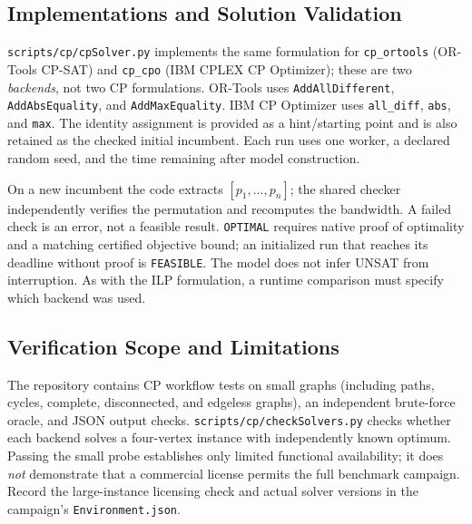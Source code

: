 \subsection{Implementations and Solution Validation}\label{sec:cp-backends}
\texttt{scripts/cp/cpSolver.py} implements the same formulation for
\texttt{cp\_ortools} (OR-Tools CP-SAT) and \texttt{cp\_cpo} (IBM CPLEX
CP Optimizer); these are two \emph{backends}, not two CP formulations.
OR-Tools uses \texttt{AddAllDifferent}, \texttt{AddAbsEquality}, and
\texttt{AddMaxEquality}. IBM CP Optimizer uses \texttt{all\_diff},
\texttt{abs}, and \texttt{max}. The identity assignment is provided as
a hint/starting point and is also retained as the checked initial
incumbent. Each run uses one worker, a declared random seed, and the
time remaining after model construction.

On a new incumbent the code extracts $[p_1,\ldots,p_n]$; the shared
checker independently verifies the permutation and recomputes the
bandwidth. A failed check is an error, not a feasible result.
\texttt{OPTIMAL} requires native proof of optimality and a matching
certified objective bound; an initialized run that reaches its deadline
without proof is \texttt{FEASIBLE}. The model does not infer UNSAT
from interruption. As with the ILP formulation, a runtime comparison
must specify which backend was used.

\subsection{Verification Scope and Limitations}\label{sec:cp-validation}
The repository contains CP workflow tests on small graphs (including
paths, cycles, complete, disconnected, and edgeless graphs), an
independent brute-force oracle, and JSON output checks.
\texttt{scripts/cp/checkSolvers.py} checks whether each backend solves
a four-vertex instance with independently known optimum. Passing the
small probe establishes only limited functional availability; it does
\emph{not} demonstrate that a commercial license permits the full
benchmark campaign. Record the large-instance licensing check and
actual solver versions in the campaign's \texttt{Environment.json}.
